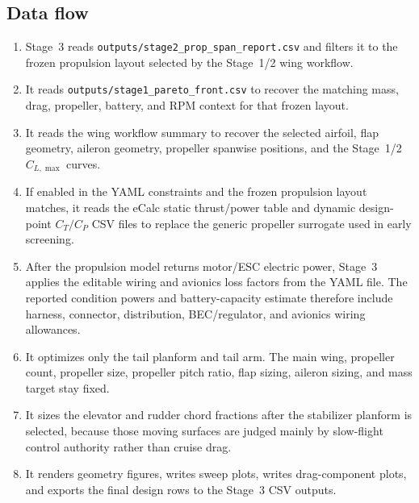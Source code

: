 \documentclass[11pt]{article}
\begin{document}
\subsection{Data flow}
\begin{enumerate}[leftmargin=*]
\item Stage~3 reads \texttt{outputs/stage2\_prop\_span\_report.csv} and filters it to the frozen propulsion layout selected by the Stage~1/2 wing workflow.
\item It reads \texttt{outputs/stage1\_pareto\_front.csv} to recover the matching mass, drag, propeller, battery, and RPM context for that frozen layout.
\item It reads the wing workflow summary to recover the selected airfoil, flap geometry, aileron geometry, propeller spanwise positions, and the Stage~1/2 \(C_{L,\max}\) curves.
\item If enabled in the YAML constraints and the frozen propulsion layout matches, it reads the eCalc static thrust/power table and dynamic design-point \(C_T/C_P\) CSV files to replace the generic propeller surrogate used in early screening.
\item After the propulsion model returns motor/ESC electric power, Stage~3 applies the editable wiring and avionics loss factors from the YAML file. The reported condition powers and battery-capacity estimate therefore include harness, connector, distribution, BEC/regulator, and avionics wiring allowances.
\item It optimizes only the tail planform and tail arm. The main wing, propeller count, propeller size, propeller pitch ratio, flap sizing, aileron sizing, and mass target stay fixed.
\item It sizes the elevator and rudder chord fractions after the stabilizer planform is selected, because those moving surfaces are judged mainly by slow-flight control authority rather than cruise drag.
\item It renders geometry figures, writes sweep plots, writes drag-component plots, and exports the final design rows to the Stage~3 CSV outputs.
\end{enumerate}
\end{document}
